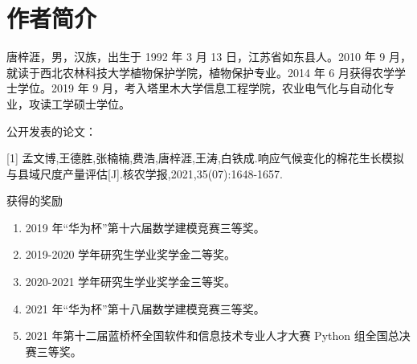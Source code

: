 \documentclass[a4paper,oneside,zihao=5,AutoFakeBold,fontset=windows]{ctexbook}
\begin{document}
\chapter*{作者简介}

唐梓涯，男，汉族，出生于 1992 年 3 月 13 日，江苏省如东县人。2010 年 9 月，就读于西北农林科技大学植物保护学院，植物保护专业。2014 年 6 月获得农学学士学位。2019 年 9 月，考入塔里木大学信息工程学院，农业电气化与自动化专业，攻读工学硕士学位。

公开发表的论文：

[1] 孟文博,王德胜,张楠楠,费浩,唐梓涯,王涛,白铁成.响应气候变化的棉花生长模拟与县域尺度产量评估[J].核农学报,2021,35(07):1648-1657.

获得的奖励
\begin{enumerate}
  \item 2019 年“华为杯”第十六届数学建模竞赛三等奖。
  \item 2019-2020 学年研究生学业奖学金二等奖。
  \item 2020-2021 学年研究生学业奖学金三等奖。
  \item 2021 年“华为杯”第十八届数学建模竞赛三等奖。
  \item 2021 年第十二届蓝桥杯全国软件和信息技术专业人才大赛 Python 组全国总决赛三等奖。
\end{enumerate}

\appendix

\end{document}

